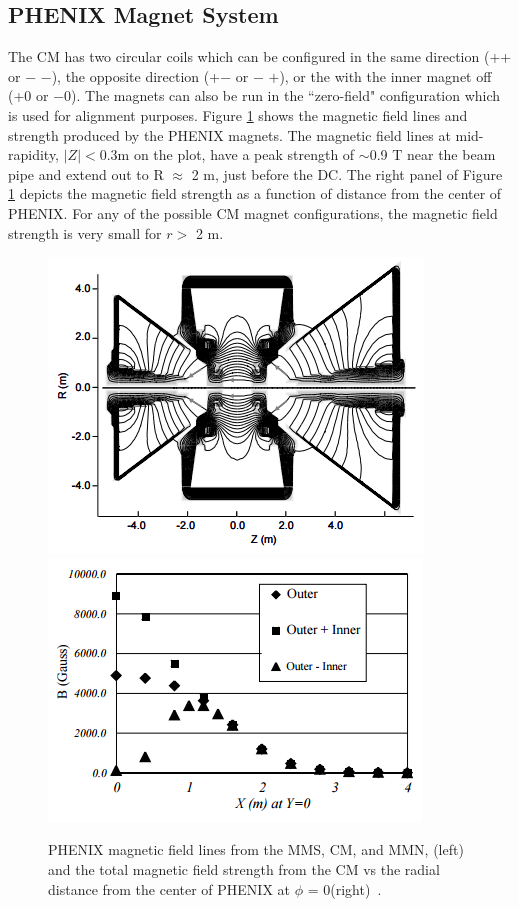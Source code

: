 \subsection{PHENIX Magnet System}
 The CM has two circular coils which can be configured in the same direction (++ or $-$ $-$), the opposite direction (+$-$ or $-$ $+$), or the with the inner magnet off (+0 or $-$0). The magnets can also be run in the ``zero-field" configuration which is used for alignment purposes. Figure \ref{fig:magnet_figures} shows the magnetic field lines and strength produced by the PHENIX magnets. The magnetic field lines at mid-rapidity, $|Z| < 0.3$m on the plot, have a peak strength of $\sim$0.9 T near the beam pipe and extend out to R $\approx$ 2 m, just before the DC. The right panel of Figure \ref{fig:magnet_figures} depicts the magnetic field strength as a function of distance from the center of PHENIX. For any of the possible CM magnet configurations, the magnetic field strength is very small for $r > $ 2 m.
\begin{figure}[!ht]
\centering
\includegraphics[width=0.45\linewidth]{figs/magnet_map.png}
\includegraphics[width=0.45\linewidth]{figs/magnetic_field_strength.png}
\caption{PHENIX magnetic field lines from the MMS, CM, and MMN, (left) and the total magnetic field strength from the CM vs the radial distance from the center of PHENIX at $\phi$ = 0(right)~\cite{Aronson2003480}.}
\label{fig:magnet_figures}
\end{figure}
